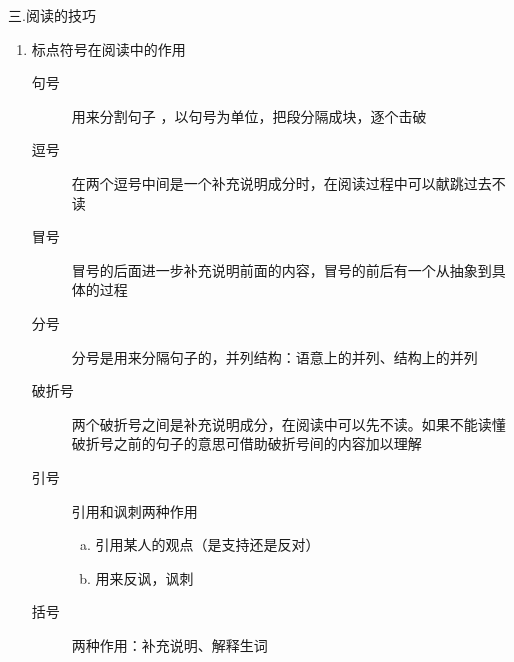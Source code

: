 \documentclass[11pt,twoside,openany,x11names,svgnames]{memoir}
\begin{document}
三.阅读的技巧
\begin{enumerate}
  \item 标点符号在阅读中的作用
\begin{description}
  \item[句号] 用来分割句子 ，以句号为单位，把段分隔成块，逐个击破
  \item[逗号] 在两个逗号中间是一个补充说明成分时，在阅读过程中可以献跳过去不读
  \item[冒号] 冒号的后面进一步补充说明前面的内容，冒号的前后有一个从抽象到具体的过程
  \item[分号] 分号是用来分隔句子的，并列结构：语意上的并列、结构上的并列
  \item[破折号] 两个破折号之间是补充说明成分，在阅读中可以先不读。如果不能读懂破折号之前的句子的意思可借助破折号间的内容加以理解
  \item[引号] 引用和讽刺两种作用
  \begin{enumerate}[(a)]
  \item 引用某人的观点（是支持还是反对）
  \item 用来反讽，讽刺
 \end{enumerate}
  \item[括号] 两种作用：补充说明、解释生词
\end{description}


\end{enumerate}
\end{document}
